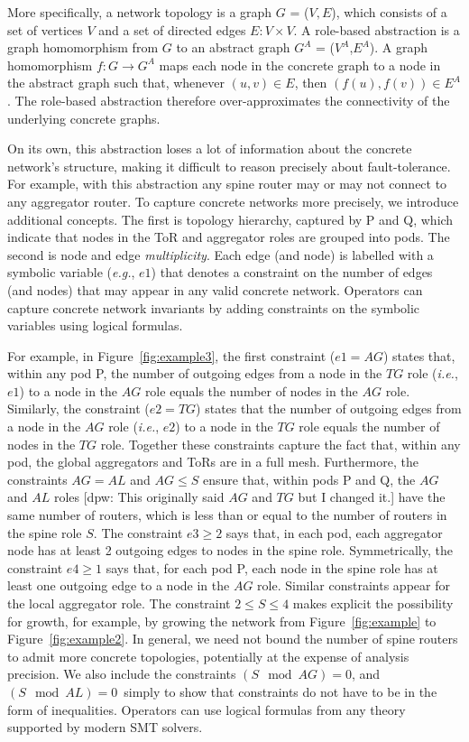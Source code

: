 \documentclass[numbers, 10pt, preprint]{sigplanconf}
\newcommand{\dpw}[1]{\textcolor{tmlblue}{[dpw: #1]}}
\newcommand{\EG}{\emph{e.g.}}
\newcommand{\IE}{\emph{i.e.}}
\begin{document}
More specifically, a network topology is a graph $G$ = ($V, E$), which consists of a set of vertices $V$ and a set of directed edges $E \colon V \times V$. A role-based abstraction is a graph homomorphism from $G$ to an abstract graph $G^A$ = ($V^A$,$E^A$). A graph homomorphism $f : G \rightarrow G^A$ maps each node in the concrete graph to a node in the abstract graph such that, whenever $(u,v) \in E$, then $(f(u),f(v)) \in E^A$. The role-based abstraction therefore over-approximates the connectivity of the underlying concrete graphs.

On its own, this abstraction loses a lot of information about the concrete network's structure, making it difficult to reason precisely about fault-tolerance.
For example, with this abstraction any spine router may or may not connect to any aggregator router.
%
To capture concrete networks more precisely,
we introduce additional concepts. The first is topology hierarchy, captured by P and Q, which indicate that nodes in the ToR and aggregator roles are grouped into pods.
The second is node and edge \emph{multiplicity}. Each edge (and node) is labelled
with a symbolic variable (\EG, $e1$) that denotes a constraint on the number of edges (and nodes) that may appear in any valid concrete network. Operators can capture concrete network invariants by adding constraints on the symbolic variables using logical formulas.

For example, in Figure~\ref{fig:example3}, the first constraint ($e1 = AG$) 
states that, within any pod P, the number of outgoing edges from a node in the 
$TG$ role (\IE, $e1$) to a node in the $AG$ role equals the number of nodes in the 
$AG$ role. Similarly, the constraint ($e2 = TG$) states that the number of 
outgoing edges from a node in the $AG$ role (\IE, $e2$) to a node in the $TG$ role 
equals the number of nodes in the $TG$ role. Together these constraints capture 
the fact that, within any pod, the global aggregators and ToRs are in 
a full mesh. Furthermore, the constraints $AG = AL$ and $AG \leq S$ ensure 
that, within pods P and Q, the $AG$ and $AL$ roles \dpw{This originally said $AG$ and $TG$ but I changed it.} have the same number of 
routers, which is less than or equal to the number of routers in the spine 
role $S$.
%
The constraint $e3 \geq 2$ says that, in each pod, each aggregator node has at least 2 outgoing edges to nodes in the spine role. Symmetrically, the constraint $e4 \geq 1$ says that, for each pod P, each node in the spine role has at least one outgoing edge to a node in the $AG$ role. Similar constraints appear for the local aggregator role. The constraint $2 \leq S \leq 4$ makes explicit the possibility for growth, for example, by growing the network from Figure~\ref{fig:example} to Figure~\ref{fig:example2}. In general, we need not bound the number of spine routers to admit more concrete topologies, potentially at the expense of analysis precision. We also include the constraints $(S \mod AG) = 0$, and $(S \mod AL) = 0$~simply to show that constraints do not have to be in the form of inequalities. Operators can use logical formulas from any theory supported by modern SMT solvers.
\end{document}
